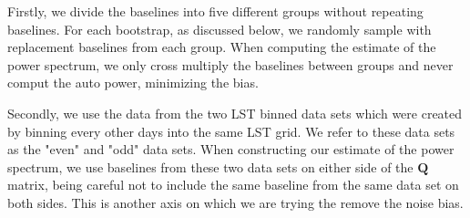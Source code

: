 \documentclass[twocolumn,numberedappendix]{emulateapj} \shorttitle{PSA64}
\begin{document}
Firstly, we divide the baselines into five different groups without repeating
baselines. For each bootstrap, as discussed below, we randomly sample with
replacement baselines from each group. When computing the estimate of the power
spectrum, we only cross multiply the baselines between groups and never comput
the auto power, minimizing the bias.

Secondly, we use the data from the two LST binned data sets which were created
by binning every other days into the same LST grid. We refer to these data sets
as the "even" and "odd" data sets. When constructing our estimate of the power
spectrum, we use baselines from these two data sets on either side of the
$\mathbf{Q}$ matrix, being careful not to include the same baseline from the
same data set on both sides. This is another axis on which we are trying the
remove the noise bias.
\end{document}
